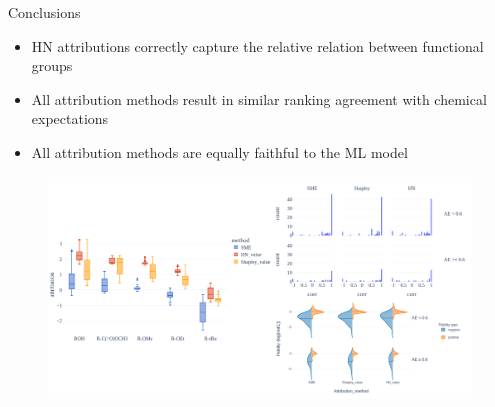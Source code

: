 \documentclass[aspectratio=169]{beamer}
\begin{document}
\begin{frame}{Conclusions}

    \begin{itemize}
        \item HN attributions correctly capture the relative relation between functional groups
        \item All attribution methods result in similar ranking agreement with chemical expectations
        \item All attribution methods are equally faithful to the ML model
    \end{itemize}

    \begin{figure}[h]
        \centering
        \includegraphics[scale=0.28]{./img/conclusion.png}
    \end{figure}

\end{frame}
\end{document}
